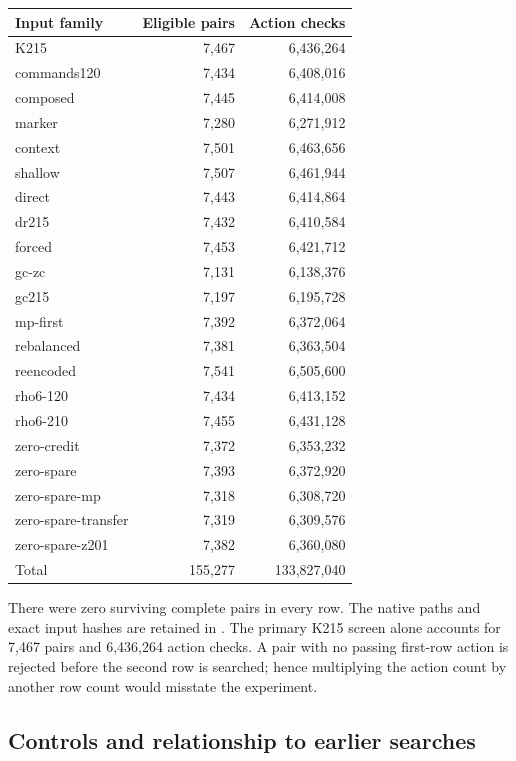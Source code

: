 \begin{center}
\small
\begin{tabular}{@{}lrr@{}}\toprule
Input family & Eligible pairs & Action checks\\\midrule
K215 & 7,467 & 6,436,264\\
commands120 & 7,434 & 6,408,016\\
composed & 7,445 & 6,414,008\\
marker & 7,280 & 6,271,912\\
context & 7,501 & 6,463,656\\
shallow & 7,507 & 6,461,944\\
direct & 7,443 & 6,414,864\\
dr215 & 7,432 & 6,410,584\\
forced & 7,453 & 6,421,712\\
gc-zc & 7,131 & 6,138,376\\
gc215 & 7,197 & 6,195,728\\
mp-first & 7,392 & 6,372,064\\
rebalanced & 7,381 & 6,363,504\\
reencoded & 7,541 & 6,505,600\\
rho6-120 & 7,434 & 6,413,152\\
rho6-210 & 7,455 & 6,431,128\\
zero-credit & 7,372 & 6,353,232\\
zero-spare & 7,393 & 6,372,920\\
zero-spare-mp & 7,318 & 6,308,720\\
zero-spare-transfer & 7,319 & 6,309,576\\
zero-spare-z201 & 7,382 & 6,360,080\\\midrule
Total & 155,277 & 133,827,040\\\bottomrule
\end{tabular}
\end{center}

There were zero surviving complete pairs in every row. The native paths
and exact input hashes are retained in .
The primary K215 screen alone accounts for 7,467 pairs and 6,436,264
action checks. A pair with no passing first-row action is rejected before
the second row is searched; hence multiplying the action count by another
row count would misstate the experiment.

\subsection{Controls and relationship to earlier searches}

